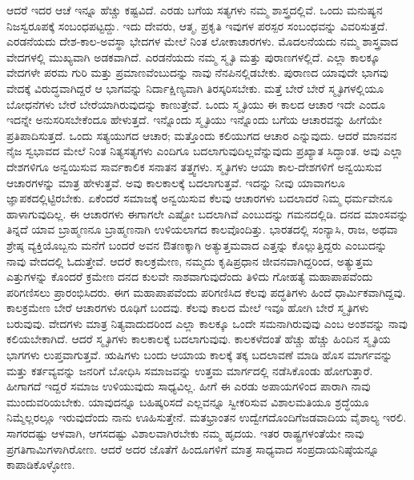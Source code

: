 ಆದರೆ ಇದರ ಆಚೆ ಇನ್ನೂ ಹೆಚ್ಚು ಕಷ್ಟವಿದೆ. ಎರಡು ಬಗೆಯ ಸತ್ಯಗಳು ನಮ್ಮ ಶಾಸ್ತ್ರದಲ್ಲಿವೆ. ಒಂದು ಮನುಷ್ಯನ ನಿಜಸ್ವರೂಪಕ್ಕೆ ಸಂಬಂಧಪಟ್ಟದ್ದು. ಇದು ದೇವರು, ಆತ್ಮ, ಪ್ರಕೃತಿ ಇವುಗಳ ಪರಸ್ಪರ ಸಂಬಂಧವನ್ನು ವಿವರಿಸುತ್ತದೆ. ಎರಡನೆಯದು ದೇಶ-ಕಾಲ-ಅವಸ್ಥಾ ಭೇದಗಳ ಮೇಲೆ ನಿಂತ ಲೋಕಾಚಾರಗಳು. ಮೊದಲನೆಯದು ನಮ್ಮ ಶಾಸ್ತ್ರವಾದ ವೇದಗಳಲ್ಲಿ ಮುಖ್ಯವಾಗಿ ಅಡಕವಾಗಿದೆ. ಎರಡನೆಯದು ನಮ್ಮ ಸ್ಮೃತಿ ಮತ್ತು ಪುರಾಣಗಳಲ್ಲಿದೆ. ಎಲ್ಲಾ ಕಾಲಕ್ಕೂ ವೇದಗಳೇ ಪರಮ ಗುರಿ ಮತ್ತು ಪ್ರಮಾಣವೆಂಬುದನ್ನು ನಾವು ನೆನಪಿನಲ್ಲಿಡಬೇಕು. ಪುರಾಣದ ಯಾವುದೇ ಭಾಗವು ವೇದಕ್ಕೆ ವಿರುದ್ಧವಾಗಿದ್ದರೆ ಆ ಭಾಗವನ್ನು ನಿರ್ದಾಕ್ಷಿಣ್ಯವಾಗಿ ತಿರಸ್ಕರಿಸಬೇಕು. ಮತ್ತೆ ಬೇರೆ ಬೇರೆ ಸ್ಮೃತಿಗಳಲ್ಲಿಯೂ ಬೋಧನೆಗಳು ಬೇರೆ ಬೇರೆಯಾಗಿರುವುದನ್ನು ಕಾಣುತ್ತೇವೆ. ಒಂದು ಸ್ಮೃತಿಯು ಈ ಕಾಲದ ಆಚಾರ ಇದೇ ಎಂದೂ ಇದನ್ನೇ ಅನುಸರಿಸಬೇಕೆಂದೂ ಹೇಳುತ್ತದೆ. ಇನ್ನೊಂದು ಸ್ಮೃತಿಯು ಇನ್ನೊಂದು ಬಗೆಯ ಆಚಾರವನ್ನು ಹೀಗೆಯೇ ಪ್ರತಿಪಾದಿಸುತ್ತದೆ. ಒಂದು ಸತ್ಯಯುಗದ ಆಚಾರ; ಮತ್ತೊಂದು ಕಲಿಯುಗದ ಆಚಾರ ಎನ್ನುವುದು. ಆದರೆ ಮಾನವನ ನೈಜ ಸ್ವಭಾವದ ಮೇಲೆ ನಿಂತ ನಿತ್ಯಸತ್ಯಗಳು ಎಂದಿಗೂ ಬದಲಾಗುವುದಿಲ್ಲವೆನ್ನುವುದು ಪ್ರಖ್ಯಾತ ಸಿದ್ಧಾಂತ. ಅವು ಎಲ್ಲಾ ದೇಶಗಳಿಗೂ ಅನ್ವಯಿಸುವ ಸಾರ್ವಕಾಲಿಕ ಸನಾತನ ತತ್ತ್ವಗಳು. ಸ್ಮೃತಿಗಳು ಆಯಾ ಕಾಲ-ದೇಶಗಳಿಗೆ ಅನ್ವಯಿಸುವ ಆಚಾರಗಳನ್ನು ಮಾತ್ರ ಹೇಳುತ್ತವೆ. ಅವು ಕಾಲಕಾಲಕ್ಕೆ ಬದಲಾಗುತ್ತವೆ. ಇದನ್ನು ನೀವು ಯಾವಾಗಲೂ ಜ್ಞಾಪಕದಲ್ಲಿಟ್ಟಿರಬೇಕು. ಏಕೆಂದರೆ ಸಮಾಜಕ್ಕೆ ಅನ್ವಯಿಸುವ ಕೆಲವು ಆಚಾರಗಳು ಬದಲಾದರೆ ನಿಮ್ಮ ಧರ್ಮವೇನೂ ಹಾಳಾಗುವುದಿಲ್ಲ. ಈ ಆಚಾರಗಳು ಈಗಾಗಲೇ ಎಷ್ಟೋ ಬದಲಾಗಿವೆ ಎಂಬುದನ್ನು ಗಮನದಲ್ಲಿಡಿ. ದನದ ಮಾಂಸವನ್ನು ತಿನ್ನದೆ ಯಾವ ಬ್ರಾಹ್ಮಣನೂ ಬ್ರಾಹ್ಮಣನಾಗಿ ಉಳಿಯಲಾಗದ ಕಾಲವೊಂದಿತ್ತು. ಭಾರತದಲ್ಲಿ ಸಂನ್ಯಾಸಿ, ರಾಜ, ಅಥವಾ ಶ್ರೇಷ್ಠ ವ್ಯಕ್ತಿಯೊಬ್ಬನು ಮನೆಗೆ ಬಂದರೆ ಅವನ ಔತಣಕ್ಕಾಗಿ ಅತ್ಯುತ್ತಮವಾದ ಎತ್ತನ್ನು ಕೊಲ್ಲುತ್ತಿದ್ದರು ಎಂಬುದನ್ನು ನಾವು ವೇದದಲ್ಲಿ ಓದುತ್ತೇವೆ. ಆದರೆ ಕಾಲಕ್ರಮೇಣ, ನಮ್ಮದು ಕೃಷಿಪ್ರಧಾನ ಜೀವನವಾಗಿದ್ದರಿಂದ, ಅತ್ಯುತ್ತಮ ಎತ್ತುಗಳನ್ನು ಕೊಂದರೆ ಕ್ರಮೇಣ ದನದ ಕುಲವೇ ನಾಶವಾಗುವುದೆಂದು ತಿಳಿದು ಗೋಹತ್ಯೆ ಮಹಾಪಾಪವೆಂದು ಪರಿಗಣಿಸಲು ಪ್ರಾರಂಭಿಸಿದರು. ಈಗ ಮಹಾಪಾಪವೆಂದು ಪರಿಗಣಿಸಿದ ಕೆಲವು ಪದ್ಧತಿಗಳು ಹಿಂದೆ ಧಾರ್ಮಿಕವಾಗಿದ್ದವು. ಕಾಲಕ್ರಮೇಣ ಬೇರೆ ಆಚಾರಗಳು ರೂಢಿಗೆ ಬಂದವು. ಕೆಲವು ಕಾಲದ ಮೇಲೆ ಇವೂ ಹೋಗಿ ಬೇರೆ ಸ್ಮೃತಿಗಳು ಬರುವುವು. ವೇದಗಳು ಮಾತ್ರ ನಿತ್ಯವಾದುದರಿಂದ ಎಲ್ಲಾ ಕಾಲಕ್ಕೂ ಒಂದೇ ಸಮನಾಗಿರುವುವು ಎಂಬ ಅಂಶವನ್ನು ನಾವು ಕಲಿಯಬೇಕಾಗಿದೆ. ಆದರೆ ಸ್ಮೃತಿಗಳು ಕಾಲಕಾಲಕ್ಕೆ ಬದಲಾಗುವುವು. ಕಾಲಕಳೆದಂತೆ ಹೆಚ್ಚು ಹೆಚ್ಚು ಹಿಂದಿನ ಸ್ಮೃತಿಯ ಭಾಗಗಳು ಲುಪ್ತವಾಗುತ್ತವೆ. ಋಷಿಗಳು ಬಂದು ಆಯಾಯ ಕಾಲಕ್ಕೆ ತಕ್ಕ ಬದಲಾವಣೆ ಮಾಡಿ ಹೊಸ ಮಾರ್ಗವನ್ನು ಮತ್ತು ಕರ್ತವ್ಯವನ್ನು ಜನರಿಗೆ ಬೋಧಿಸಿ ಸಮಾಜವನ್ನು ಉತ್ತಮ ಮಾರ್ಗದಲ್ಲಿ ನಡೆಸಿಕೊಂಡು ಹೋಗುತ್ತಾರೆ. ಹೀಗಾಗದೆ ಇದ್ದರೆ ಸಮಾಜ ಉಳಿಯುವುದು ಸಾಧ್ಯವಿಲ್ಲ. ಹೀಗೆ ಈ ಎರಡು ಅಪಾಯಗಳಿಂದ ಪಾರಾಗಿ ನಾವು ಮುಂದುವರಿಯಬೇಕು. ಯಾವುದನ್ನೂ ಬಹಿಷ್ಕರಿ\-ಸದೆ ಎಲ್ಲವನ್ನೂ ಸ್ವೀಕರಿಸುವ ವಿಶಾಲಮತಿಯೂ ಶ್ರದ್ಧೆಯೂ ನಿಮ್ಮೆಲ್ಲರಲ್ಲೂ\- ಇರುವುದೆಂದು ನಾನು ಊಹಿಸುತ್ತೇನೆ. ಮತಭ್ರಾಂತನ ಉದ್ವೇಗದೊಂದಿಗೆ\break ಜಡವಾದಿಯ ವೈಶಾಲ್ಯ ಇರಲಿ. ಸಾಗರದಷ್ಟು ಆಳವಾಗಿ, ಆಗಸದಷ್ಟು ವಿಶಾಲವಾಗಿರಬೇಕು ನಮ್ಮ ಹೃದಯ. ಇತರ ರಾಷ್ಟ್ರಗಳಂತೆಯೇ ನಾವು ಪ್ರಗತಿಗಾಮಿಗಳಾಗಿರೋಣ. ಆದರೆ ಅದರ ಜೊತೆಗೆ ಹಿಂದೂಗಳಿಗೆ ಮಾತ್ರ ಸಾಧ್ಯವಾದ ಸಂಪ್ರದಾಯನಿಷ್ಠೆಯನ್ನೂ ಕಾಪಾಡಿಕೊಳ್ಳೋಣ.

